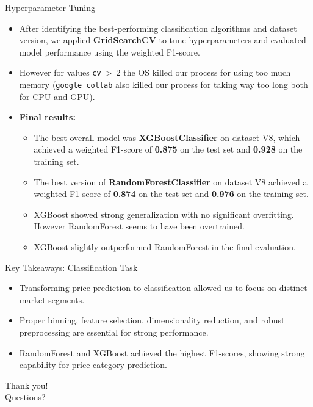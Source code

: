 \documentclass{beamer}
\begin{document}
\begin{frame}{Hyperparameter Tuning}
    \begin{itemize}
        \item After identifying the best-performing classification algorithms
                and dataset version, we applied \textbf{GridSearchCV} to tune
                hyperparameters and evaluated model performance using the
                weighted F1-score.
        \item However for values \texttt{cv}~\textgreater~2 the OS killed our
                process for using too much memory (\texttt{google collab} also
                killed our process for taking way too long both for CPU and
                GPU).
        \item \textbf{Final results:}
        \begin{itemize}
            \item The best overall model was \textbf{XGBoostClassifier} on
                    dataset V8, which achieved a weighted F1-score of
                    \textbf{0.875} on the test set and \textbf{0.928} on the
                    training set.
            \item The best version of \textbf{RandomForestClassifier} on
                    dataset V8 achieved a weighted F1-score of \textbf{0.874}
                    on the test set and \textbf{0.976} on the training set.
            \item XGBoost showed strong generalization with no significant
                overfitting. However RandomForest seems to have been
                overtrained.
            \item XGBoost slightly outperformed RandomForest in the final
                evaluation.
        \end{itemize}
    \end{itemize}
\end{frame}

\begin{frame}{Key Takeaways: Classification Task}
        \begin{itemize}
                \item Transforming price prediction to classification allowed
                        us to focus on distinct market segments.
                \item Proper binning, feature selection, dimensionality
                        reduction, and robust preprocessing are essential for
                        strong performance.
                \item RandomForest and XGBoost achieved the highest F1-scores,
                        showing strong capability for price category
                        prediction.
        \end{itemize}
\end{frame}

\begin{frame}
        \centering
        \Huge
        Thank you! \\
        Questions?
\end{frame}
\end{document}
